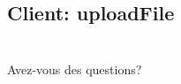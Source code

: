 \documentclass[11pt]{beamer}
\begin{document}
		\begin{frame}
			
		\end{frame}

	\subsection*{Client: uploadFile}
	
		\begin{frame}
			
		\end{frame}

		\begin{frame}
			
		\end{frame}

\section*{}

	\begin{frame}
		\begin{center}
			Avez-vous des questions?
		\end{center}
	\end{frame}
\end{document}
